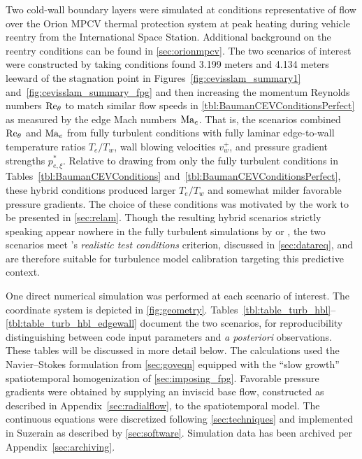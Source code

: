 Two cold-wall boundary layers were simulated at conditions representative of
flow over the Orion MPCV thermal protection system at peak heating during
vehicle reentry from the International Space Station.
%
Additional background on the reentry conditions can be found in \autoref{sec:orionmpcv}.
%
The two scenarios of interest were constructed by taking conditions found 3.199
meters and 4.134 meters leeward of the stagnation point in
Figures~\ref{fig:cevisslam_summary1} and~\ref{fig:cevisslam_summary_fpg} and
then increasing the momentum Reynolds numbers $\Reynolds[\theta]{}$ to match
similar flow speeds in \autoref{tbl:BaumanCEVConditionsPerfect} as measured by
the edge Mach numbers $\Mach[e]{}$.
%
That is, the scenarios combined $\Reynolds[\theta]$ and $\Mach[e]{}$ from fully
turbulent conditions with fully laminar edge-to-wall temperature ratios
$T_e/T_w$, wall blowing velocities $v_w^+$, and pressure gradient strengths
$p_{e,\xi}^{\ast}$.
%
Relative to drawing from only the fully turbulent conditions in
Tables~\ref{tbl:BaumanCEVConditions} and~\ref{tbl:BaumanCEVConditionsPerfect},
these hybrid conditions produced larger $T_e/T_w$ and somewhat
milder favorable pressure gradients.
%
The choice of these conditions was motivated by the
work to be presented in \autoref{sec:relam}.
%
Though the resulting hybrid scenarios strictly speaking appear nowhere in the
fully turbulent simulations by \citet{Bauman2011Loose} or
\citet{Stogner2011Uncertainty}, the two scenarios meet
\citet{Settles1991Hypersonic}'s \emph{realistic test conditions} criterion,
discussed in \autoref{sec:datareq}, and are therefore suitable for
turbulence model calibration targeting this predictive context.



One direct numerical simulation was performed at each scenario of interest.  The
coordinate system is depicted in \autoref{fig:geometry}.
Tables~\ref{tbl:table_turb_hbl}--\ref{tbl:table_turb_hbl_edgewall}
document the two scenarios,
for reproducibility
distinguishing between code input parameters and \emph{a posteriori} observations.
These tables will be discussed in more detail below.  The
calculations used the Navier--Stokes formulation from \autoref{sec:goveqn}
equipped with the ``slow growth'' spatiotemporal homogenization of
\autoref{sec:imposing_fpg}.  Favorable pressure gradients were obtained by
supplying an inviscid base flow, constructed as described in
Appendix~\ref{sec:radialflow}, to the spatiotemporal model.  The continuous
equations were discretized following \autoref{sec:techniques} and implemented in
Suzerain as described by \autoref{sec:software}.  Simulation data
has been archived per Appendix~\ref{sec:archiving}.


